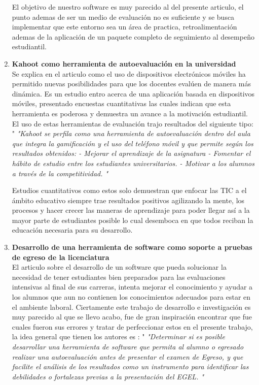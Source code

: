 \documentclass[12pt]{book}
\begin{document}
\begin{enumerate}
    	{\normalsize El objetivo de nuestro software es muy parecido al del presente articulo, el punto ademas de ser un medio de evaluación no es suficiente y se busca implementar que este entorno sea un área de practica, retroalimentación ademas de la aplicación de un paquete completo de seguimiento al desempeño estudiantil.}
    	
    	\item \textbf{Kahoot como herramienta de autoevaluación en la universidad\\}
    	{\normalsize Se explica en el articulo como el uso de dispositivos electrónicos móviles ha permitido nuevas posibilidades para que los docentes evalúen de manera más dinámica. Es un estudio entro acerca de una aplicación basada en dispositivos móviles, presentado encuestas cuantitativas las cuales indican que esta herramienta es poderosa y demuestra un avance a la motivación estudiantil. \cite{sempere2018kahoot} El uso de estas herramientas de evaluación trajo resultados del siguiente tipo: " \textit{ "Kahoot se perfila como una herramienta de autoevaluación dentro del aula que integra la gamificación y el uso del teléfono móvil y que permite según los resultados obtenidos:
    			- Mejorar el aprendizaje de la asignatura
    			- Fomentar el hábito de estudio entre los estudiantes universitarios.
    			- Motivar a los alumnos a través de la competitividad. " }} 
    	
    	{\normalsize Estudios cuantitativos como estos solo demuestran que enfocar las TIC a el ámbito educativo siempre trae resultados positivos agilizando la mente, los procesos y hacer crecer las maneras de aprendizaje para poder llegar así a la mayor parte de estudiantes posible lo cual desemboca en que todos reciban la educación necesaria para su desarrollo.}
    	
    	
    	\item \textbf{Desarrollo de una herramienta de software como soporte
    		a pruebas de egreso de la licenciatura\\}
    	{\normalsize El articulo sobre el desarrollo de un software que pueda solucionar la necesidad de tener estudiantes bien preparados para las evaluaciones intensivas al final de sus carreras, intenta mejorar el conocimiento y ayudar a los alumnos que aun no contienen los conocimientos adecuados para estar en el ambiente laboral. \cite{sempere2018kahoot} Ciertamente este trabajo de desarrollo e investigación es muy parecido al que se llevo acabo, fue de gran inspiración encontrar que fue cuales fueron sus errores y tratar de perfeccionar estos en el presente trabajo, la idea general que tienen los autores es : " \textit{ "Determinar si es posible desarrollar una herramienta de software que permita al alumno o egresado realizar una autoevaluación antes de presentar el examen de Egreso, y que facilite el análisis de los resultados como un instrumento para identificar las debilidades o fortalezas previas a la presentación del EGEL. " }} 
    	

\end{enumerate}
\end{document}
